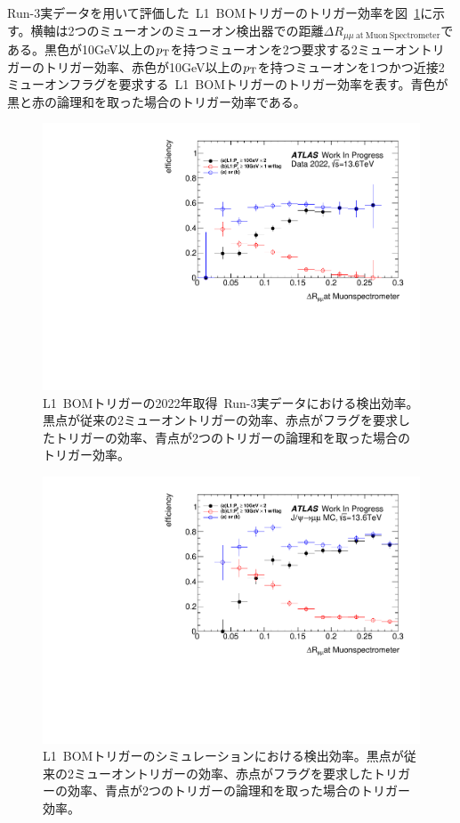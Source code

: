 Run-3実データを用いて評価した~L1~BOMトリガーのトリガー効率を図~\ref{fig:L1BOMEffData}に示す。横軸は2つのミューオンのミューオン検出器での距離$\Delta R_{\mu\mu~\mathrm{at~Muon~Spectrometer}}$である。黒色が10GeV以上の$p_\mathrm{T}$を持つミューオンを2つ要求する2ミューオントリガーのトリガー効率、赤色が10GeV以上の$p_\mathrm{T}$を持つミューオンを1つかつ近接2ミューオンフラグを要求する~L1~BOMトリガーのトリガー効率を表す。青色が黒と赤の論理和を取った場合のトリガー効率である。

\begin{figure}[H]
    \centering
    \includegraphics[clip, width=12cm]{fig/4/BOM_eff.pdf}
    \caption{L1~BOMトリガーの2022年取得~Run-3実データにおける検出効率。黒点が従来の2ミューオントリガーの効率、赤点がフラグを要求したトリガーの効率、青点が2つのトリガーの論理和を取った場合のトリガー効率。}
    \label{fig:L1BOMEffData}
\end{figure}

\begin{figure}[H]
    \centering
    \includegraphics[clip, width=12cm]{fig/4/BOM_MC_eff.pdf}
    \caption{L1~BOMトリガーのシミュレーションにおける検出効率。黒点が従来の2ミューオントリガーの効率、赤点がフラグを要求したトリガーの効率、青点が2つのトリガーの論理和を取った場合のトリガー効率。}
    \label{fig:L1BOMEffMC}
\end{figure}

